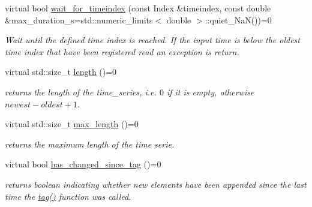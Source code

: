 \begin{DoxyCompactItemize}
virtual bool \hyperlink{classtime__series_1_1TimeSeriesInterface_aa09c55259a1f34491b5ecdd1505ffdbf}{wait\+\_\+for\+\_\+timeindex} (const Index \&timeindex, const double \&max\+\_\+duration\+\_\+s=std\+::numeric\+\_\+limits$<$ double $>$\+::quiet\+\_\+\+NaN())=0
\begin{DoxyCompactList}\small\item\em Wait until the defined time index is reached. If the input time is below the oldest time index that have been registered read an exception is return. \end{DoxyCompactList}\item 
\mbox{\label{classtime__series_1_1TimeSeriesInterface_a90f6ed15d82006dbc7ef7783d9f6ff7a}} 
virtual std\+::size\+\_\+t \hyperlink{classtime__series_1_1TimeSeriesInterface_a90f6ed15d82006dbc7ef7783d9f6ff7a}{length} ()=0
\begin{DoxyCompactList}\small\item\em returns the length of the time\+\_\+series, i.\+e. $0$ if it is empty, otherwise $newest - oldest +1 $. \end{DoxyCompactList}\item 
virtual std\+::size\+\_\+t \hyperlink{classtime__series_1_1TimeSeriesInterface_aded8927e82c060aa3367f17dfd59a8ec}{max\+\_\+length} ()=0
\begin{DoxyCompactList}\small\item\em returns the maximum length of the time serie. \end{DoxyCompactList}\item 
\mbox{\label{classtime__series_1_1TimeSeriesInterface_a2758b463ea41393a24ea37ccd0f5feb4}} 
virtual bool \hyperlink{classtime__series_1_1TimeSeriesInterface_a2758b463ea41393a24ea37ccd0f5feb4}{has\+\_\+changed\+\_\+since\+\_\+tag} ()=0
\begin{DoxyCompactList}\small\item\em returns boolean indicating whether new elements have been appended since the last time the \hyperlink{classtime__series_1_1TimeSeriesInterface_a34e881c9496901127baf1d907d7399ac}{tag()} function was called. \end{DoxyCompactList}\item 
\mbox{\label{classtime__series_1_1TimeSeriesInterface_a34e881c9496901127baf1d907d7399ac}} 

\end{DoxyCompactItemize}
